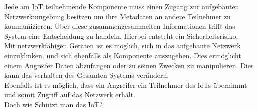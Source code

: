 Jede am \ac{IoT} teilnehmende Komponente muss einen Zugang zur aufgebauten Netzwerkumgebung besitzen um ihre Metadaten an andere Teilnehmer zu kommunizieren. Über diese zusammengesammelten Informationen trifft das System eine Entscheidung zu handeln. Hierbei entsteht ein Sicherheitsrisiko.\\
Mit netzwerkfähigen Geräten ist es möglich, sich in das aufgebaute Netzwerk einzuklinken, und sich ebenfalls als Komponente auszugeben. Dies ermöglicht einem Angreifer Daten abzufangen oder zu seinen Zwecken zu manipulieren. Dies kann das verhalten des Gesamten Systems verändern.\\
Ebenfalls ist es möglich, dass ein Angreifer ein Teilnehmer des \ac{IoT}s übernimmt und somit Zugriff auf das Netzwerk erhält.\\

Doch wie Schützt man das \ac{IoT}?\\

